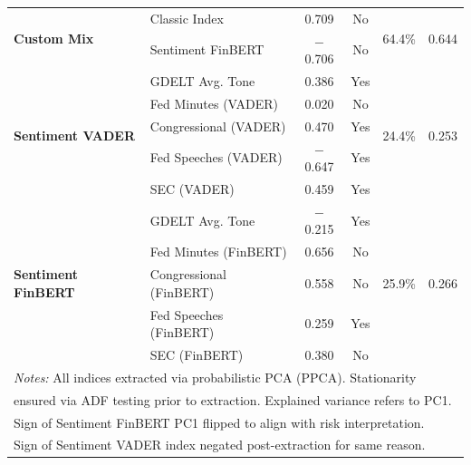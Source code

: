 \documentclass[12pt,a4paper]{report}\usepackage[a4paper, top=2.5cm, bottom=2.5cm, left=2.5cm, right=2.5cm]{geometry}
\begin{document}
\begin{table}[H]
{\begin{tabular}{ll cc cc}
\multirow{2}{*}{\textbf{Custom Mix}}
 & Classic Index           &  0.709 & No & \multirow{2}{*}{64.4\%} & \multirow{2}{*}{0.644} \\
 & Sentiment FinBERT       & $-$0.706 & No & & \\
\midrule

\multirow{5}{*}{\textbf{Sentiment VADER}}
 & GDELT Avg. Tone          &  0.386 & Yes & \multirow{5}{*}{24.4\%} & \multirow{5}{*}{0.253} \\
 & Fed Minutes (VADER)      &  0.020 & No  & & \\
 & Congressional (VADER)    &  0.470 & Yes & & \\
 & Fed Speeches (VADER)     & $-$0.647 & Yes & & \\
 & SEC (VADER)              &  0.459 & Yes & & \\
\midrule

\multirow{5}{*}{\textbf{Sentiment FinBERT}}
 & GDELT Avg. Tone            & $-$0.215 & Yes & \multirow{5}{*}{25.9\%} & \multirow{5}{*}{0.266} \\
 & Fed Minutes (FinBERT)      &  0.656 & No  & & \\
 & Congressional (FinBERT)    &  0.558 & No  & & \\
 & Fed Speeches (FinBERT)     &  0.259 & Yes & & \\
 & SEC (FinBERT)              &  0.380 & No  & & \\
\bottomrule
\multicolumn{6}{l}{\footnotesize \textit{Notes:} All indices extracted via probabilistic PCA (PPCA). Stationarity}\\
\multicolumn{6}{l}{\footnotesize ensured via ADF testing prior to extraction. Explained variance refers to PC1.}\\
\multicolumn{6}{l}{\footnotesize Sign of Sentiment FinBERT PC1 flipped to align with risk interpretation.}\\
\multicolumn{6}{l}{\footnotesize Sign of Sentiment VADER index negated post-extraction for same reason.}\\
\end{tabular}%
}
\end{table} 
\end{document}
